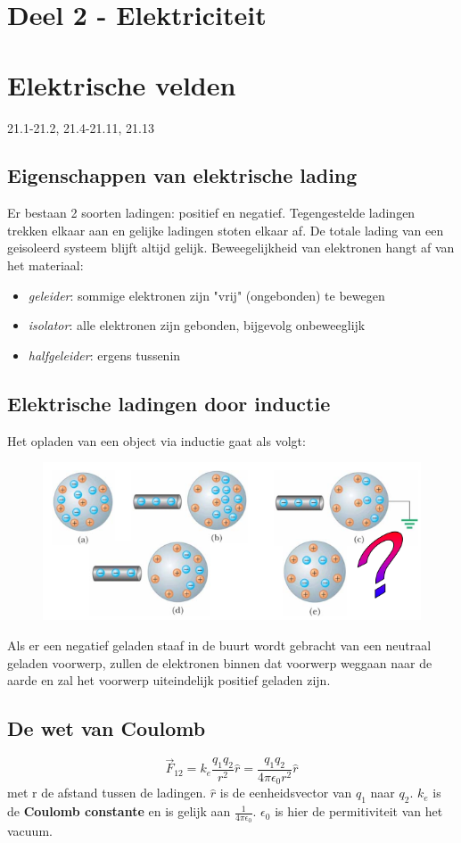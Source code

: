 \documentclass[12pt,a4paper]{article}
\begin{document}
    \section{Deel 2 - Elektriciteit}


    \section{Elektrische velden}
    21.1-21.2, 21.4-21.11, 21.13
	\subsection{Eigenschappen van elektrische lading}
	Er bestaan 2 soorten ladingen: positief en negatief. Tegengestelde ladingen trekken elkaar aan en gelijke ladingen stoten elkaar af. De totale lading van een geisoleerd systeem blijft altijd gelijk. Beweegelijkheid van elektronen hangt af van het materiaal:
	\begin{itemize}
		\item \textit{geleider}: sommige elektronen zijn "vrij" (ongebonden) te bewegen
		\item \textit{isolator}: alle elektronen zijn gebonden, bijgevolg onbeweeglijk
		\item  \textit{halfgeleider}: ergens tussenin
	\end{itemize}
	
	\subsection{Elektrische ladingen door inductie}
	Het opladen van een object via inductie gaat als volgt:
	\begin{figure}[h]
		\centering
		\includegraphics[width=0.7\linewidth]{inductie}
		\label{inductie}
	\end{figure}
	Als er een negatief geladen staaf in de buurt wordt gebracht van een neutraal geladen voorwerp, zullen de elektronen binnen dat voorwerp weggaan naar de aarde en zal het voorwerp uiteindelijk positief geladen zijn. 
	
	\subsection{De wet van Coulomb}
	\[\vec{F}_12 = k_e\frac{q_1 q_2}{r^2}\hat{r} = \frac{q_1q_2}{4\pi \epsilon_0 r^2}\hat{r}\]
	met r de afstand tussen de ladingen. \(\hat{r}\) is de eenheidsvector van $q_1$ naar $q_2$.
	$k_e$ is de \textbf{Coulomb constante} en is gelijk aan \(\frac{1}{4\pi\epsilon_0}\). $\epsilon_0$ is hier de permitiviteit van het vacuum.
	
\end{document}

